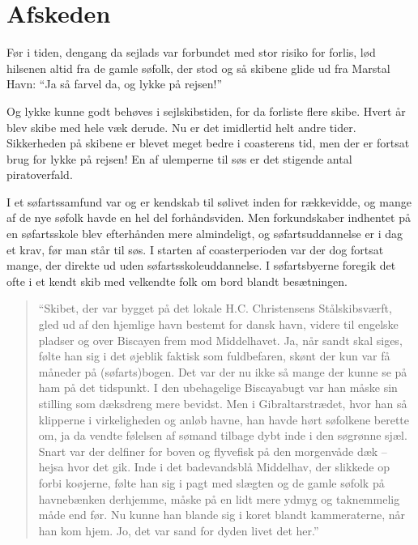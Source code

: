 \chapter{Afskeden}

Før i tiden, dengang da sejlads var forbundet med stor risiko for
forlis, lød hilsenen altid fra de gamle søfolk, der stod og så skibene
glide ud fra Marstal Havn: ``Ja så farvel da, og lykke på rejsen!''

Og lykke kunne godt behøves i sejlskibstiden, for da forliste flere skibe.
Hvert år blev skibe med hele  væk derude. Nu er det imidlertid helt andre tider. Sikkerheden på
skibene er blevet meget bedre i coasterens tid, men der er fortsat brug
for lykke på rejsen! En af ulemperne til søs er det stigende antal
piratoverfald.

I et søfartssamfund var og er kendskab til sølivet inden for rækkevidde,
og mange af de nye søfolk havde en hel del forhåndsviden. Men
forkundskaber indhentet på en søfartsskole blev efterhånden mere
almindeligt, og søfartsuddannelse er i dag et krav, før man står til søs.
I starten af coasterperioden var der dog fortsat mange, der
 direkte ud uden
søfartsskoleuddannelse. I søfartsbyerne foregik det ofte i et kendt skib
med velkendte folk om bord blandt besætningen.

\begin{quote}
    ``Skibet, der var
    bygget på det lokale H.C. Christensens Stålskibsværft, gled ud af den
    hjemlige havn bestemt for dansk havn, videre til engelske pladser og
    over Biscayen frem mod Middelhavet. Ja, når sandt skal siges, følte han
    sig i det øjeblik faktisk som fuldbefaren, skønt der kun var få måneder
    på (søfarts)bogen. Det var der nu ikke så mange der kunne se på ham på
    det tidspunkt. I den ubehagelige Biscayabugt var han måske sin stilling
    som dæksdreng mere bevidst. Men i Gibraltarstrædet, hvor han så
    klipperne i virkeligheden og anløb havne, han havde hørt søfolkene
    berette om, ja da vendte følelsen af sømand tilbage dybt inde i den
    søgrønne sjæl. Snart var der delfiner for boven og flyvefisk på den
    morgenvåde dæk -- hejsa hvor det gik. Inde i det badevandsblå Middelhav,
    der slikkede op forbi koøjerne, følte han sig i pagt med slægten og de
    gamle søfolk på havnebænken derhjemme, måske på en lidt mere ydmyg og
    taknemmelig måde end før. Nu kunne han blande sig i koret blandt
    kammeraterne, når han kom hjem. Jo, det var sand for dyden livet det
    her.''
\end{quote}

